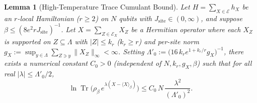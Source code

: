 \documentclass[11pt,a4paper]{article}
\numberwithin{equation}{section}
\theoremstyle{plain}
\newtheorem{lemma}[theorem]{Lemma}
\theoremstyle{definition}
\newcommand{\Tr}{\operatorname{Tr}}
\begin{document}
\begin{lemma}[High-Temperature Trace Cumulant Bound]\label{lem:kp-cumulant}
Let $H = \sum_{X\in\mathcal{E}} h_X$ be an $r$-local Hamiltonian ($r\ge 2$) on $N$ qubits with $J_{\mathrm{site}}\in(0,\infty)$, and suppose $\beta \le (8e^2 r J_{\mathrm{site}})^{-1}$. Let $X = \sum_{Z\in\mathcal{E}_X} X_Z$ be a Hermitian operator where each $X_Z$ is supported on $Z\subseteq\Lambda$ with $|Z| \le k_r$ ($k_r \ge r$) and per-site norm $g_X := \sup_{y\in\Lambda}\sum_{Z\ni y}\|X_Z\|_\infty < \infty$. Setting $\Lambda'_0 := \bigl(16\,k_r e^{1 + k_r/r} g_X\bigr)^{-1}$, there exists a numerical constant $C_0 > 0$ (independent of $N, k_r, g_X, \beta$) such that for all real $|\lambda| \le \Lambda'_0/2$,
\begin{equation}\label{eq:kp-cumulant}
  \ln\Tr\!\bigl(\rho_\beta\,e^{\lambda(X - \langle X\rangle_\beta)}\bigr) \le C_0\,N\,\frac{\lambda^2}{(\Lambda'_0)^2}.
\end{equation}
\end{lemma}
\end{document}
